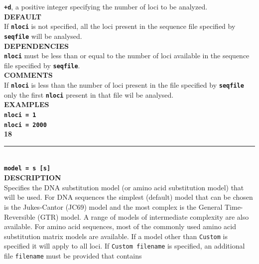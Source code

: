 \documentclass{book}
\numberwithin{equation}{section} \renewcommand{\baselinestretch}{0.55}
\begin{document}
\textbf{\texttt{+d}}, a positive integer specifying the number of loci to be analyzed. \vspace{5pt}\\
\textbf{DEFAULT} \vspace{5pt}\\
If \textbf{\texttt{nloci}} is not specified, all the loci present in the sequence file specified by \textbf{\texttt{seqfile}} will be analysed. \vspace{5pt}\\
\textbf{DEPENDENCIES} \vspace{5pt}\\
\textbf{\texttt{nloci}} must be less than or equal to the number of loci available in the sequence file specified by \textbf{\texttt{seqfile}}.  \vspace{5pt}\\
\textbf{COMMENTS} \vspace{5pt}\\
If \textbf{\texttt{nloci}} is less than the number of loci present in
the file specified by \textbf{\texttt{seqfile}} only the first
\textbf{\texttt{nloci}} present
in that file wil be analysed. \vspace{5pt}\\
\textbf{EXAMPLES} \vspace{5pt}\\
\textbf{\texttt{nloci = 1}} \vspace{5pt}\\
\textbf{\texttt{nloci = 2000}}\vspace{10pt}\\
\textbf{{\large 18}} \\
\noindent\rule{\textwidth}{0.8pt} \\
\textbf{{\Large \texttt{model = s [s]}}} \vspace{5pt}\\
\textbf{DESCRIPTION} \vspace{5pt}\\
Specifies the DNA substitution model (or amino acid substitution model) that will be used. For DNA sequences
the simplest (default) model that can be chosen is the Jukes-Cantor (JC69) model and the most complex is the
General Time-Reversible (GTR) model. A range of models of intermediate complexity are also available. For
amino acid sequences, most of the commonly used amino acid substitution matrix models are available. If a model other than \texttt{Custom}
is specified it will apply to all loci. If \texttt{Custom filename} is specified, an additional file \texttt{filename} must be provided that contains
\end{document}
